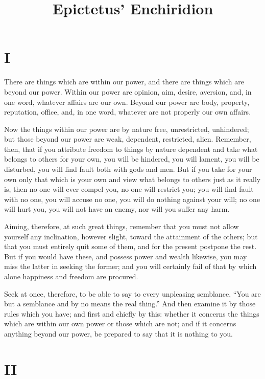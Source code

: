 \documentclass[11pt]{article}
\title{Epictetus' Enchiridion}
\author{}
\date{}
\begin{document}
\maketitle

\section*{I}

There are things which are within our power, and there are things which are beyond our power. Within our power are opinion, aim, desire, aversion, and, in one word, whatever affairs are our own. Beyond our power are body, property, reputation, office, and, in one word, whatever are not properly our own affairs.

Now the things within our power are by nature free, unrestricted, unhindered; but those beyond our power are weak, dependent, restricted, alien. Remember, then, that if you attribute freedom to things by nature dependent and take what belongs to others for your own, you will be hindered, you will lament, you will be disturbed, you will find fault both with gods and men. But if you take for your own only that which is your own and view what belongs to others just as it really is, then no one will ever compel you, no one will restrict you; you will find fault with no one, you will accuse no one, you will do nothing against your will; no one will hurt you, you will not have an enemy, nor will you suffer any harm.

Aiming, therefore, at such great things, remember that you must not allow yourself any inclination, however slight, toward the attainment of the others; but that you must entirely quit some of them, and for the present postpone the rest. But if you would have these, and possess power and wealth likewise, you may miss the latter in seeking the former; and you will certainly fail of that by which alone happiness and freedom are procured.

Seek at once, therefore, to be able to say to every unpleasing semblance, “You are but a semblance and by no means the real thing.” And then examine it by those rules which you have; and first and chiefly by this: whether it concerns the things which are within our own power or those which are not; and if it concerns anything beyond our power, be prepared to say that it is nothing to you.

\section*{II}
\end{document}
